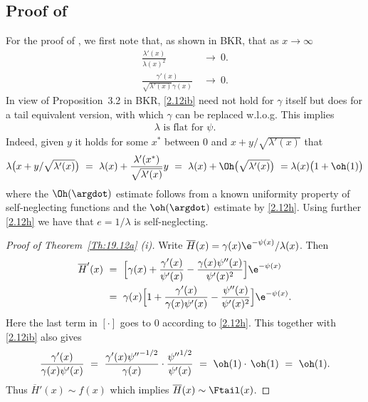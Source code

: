\begin{subappendices}
\section{Proof of } \label{S:ProofofTheorem}

For the proof of , we first note that,
as shown in BKR, that as $x\to \infty$
\begin{align}
\label{2.12h} \frac{\lambda'(x)}{{\lambda(x)}^2}\ &\to\ 0.\\
\label{2.12ib} \frac{\gamma'(x)}{{\sqrt{\lambda'(x)}}\gamma(x)}\ &\to\ 0.
\end{align}
In view of Proposition~3.2 in BKR, \eqref{2.12ib} need not hold for $\gamma$ itself but does for  a tail equivalent version, with which $\gamma$ can be replaced w.l.o.g. This implies
\begin{align}
\label{19.12c} \lambda\text{\ is flat for }\psi.
\end{align}
Indeed, given $y$ it holds for some $x^*$ between $0$ and $x+y/\sqrt{\lambda'(x)}$ that
\[\lambda\bigl(x+y/\sqrt{\lambda'(x)}\bigr)\ =\ \lambda(x)+\frac{\lambda'(x^*)}{\sqrt{\lambda'(x)}}y\ =\
\lambda(x)+\Oh\bigl(\sqrt{\lambda'(x)}\bigr)\ = \lambda(x)\bigl(1+\oh(1)\bigr)\]
where the $\Oh(\argdot)$ estimate follows from a known uniformity property of self-neglecting functions and the $\oh(\argdot)$ estimate
by \eqref{2.12h}.
Using further \eqref{2.12h} we have that $e=1/\lambda$ is self-neglecting.



\begin{proof}[Proof of Theorem~{\ref{Th:19.12a}} {\rm (i)}]
Write $\overline{H}(x)=\gamma(x)\e^{-\psi(x)}/\lambda(x)$. %
Then
\begin{align*}\overline{H}'(x)\ &=\ \Bigl[\gamma(x)+\frac{\gamma'(x)}{\psi'(x)}-
\frac{\gamma(x)\psi''(x)}{\psi'(x)^2}\Bigr]\e^{-\psi(x)}\\
&=\ \gamma(x)\Bigl[1+\frac{\gamma'(x)}{\gamma(x)\psi'(x)}-
\frac{\psi''(x)}{\psi'(x)^2}\Bigr]\e^{-\psi(x)}.
\end{align*}
Here the last term in $[\cdot]$ goes to 0 according to \eqref{2.12h}. This
together with \eqref{2.12ib}
also gives
\[\frac{\gamma'(x)}{\gamma(x)\psi'(x)}\ =\ \frac{\gamma'(x){\psi''}^{-1/2}}{\gamma(x)}\cdot
\frac{{\psi''}^{1/2}}{\psi'(x)}\ =\ \oh(1)\cdot\,\oh(1)\ =\ \oh(1).\]
Thus $\overline{H}'(x)\sim f(x)$ which implies $\overline{H}(x)\sim \Ftail(x)$.
\end{proof}


\end{subappendices}
